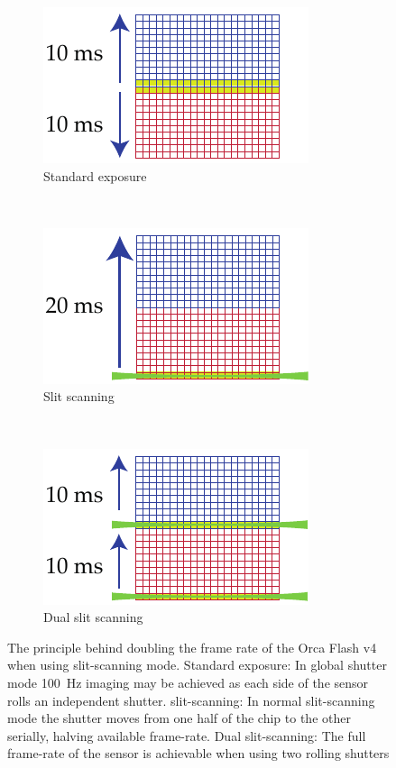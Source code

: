 \begin{figure}
  \centering
  \begin{subfigure}[t]{0.3\linewidth}
        \includegraphics{dual_slit_scanning/standard}
        \caption{Standard exposure}
  \end{subfigure}~
  \begin{subfigure}[t]{0.3\linewidth}
        \includegraphics{dual_slit_scanning/single_slit}
        \caption{Slit scanning}
  \end{subfigure}~
  \begin{subfigure}[t]{0.3\linewidth}
        \includegraphics{dual_slit_scanning/dual_slit}
        \caption{Dual slit scanning}
  \end{subfigure}
  \caption{
  The principle behind doubling the frame rate of the Orca Flash v4 when using \gls{slit-scanning} mode.
  Standard exposure: In global shutter mode \SI{100}{\hertz} imaging may be achieved as each side of the sensor rolls an independent shutter.
  \Gls{slit-scanning}: In normal \gls{slit-scanning} mode the shutter moves from one half of the chip to the other serially, halving available frame-rate.
  Dual \gls{slit-scanning}:
  The full frame-rate of the sensor is achievable when using two rolling shutters
  }
  \label{fig:dual_slit_scanning}
\end{figure}

